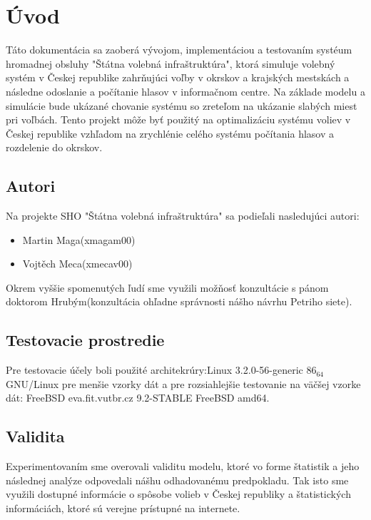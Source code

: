 \documentclass[12pt,a4paper,titlepage,final]{article}
\begin{document}


\tableofcontents
\newpage

\section{Úvod}
Táto dokumentácia sa zaoberá vývojom, implementáciou a testovaním systéum hromadnej obsluhy "Štátna volebná infraštruktúra", ktorá simuluje volebný systém v Českej republike zahrňujúci voľby v okrskov a krajských mestskách a následne odoslanie a počítanie hlasov v informačnom centre.
\indent
Na základe modelu a simulácie bude ukázané chovanie systému so zreteľom na ukázanie slabých miest pri voľbách. Tento projekt môže byť použitý na optimalizáciu systému voliev v Českej republike vzhľadom na zrychlénie celého systému počítania hlasov a rozdelenie do okrskov.

\subsection{Autori}
Na projekte SHO "Štátna volebná infraštruktúra" sa podieľali nasledujúci autori:
\begin{itemize}
\item Martin Maga(xmagam00)
\item Vojtěch Meca(xmecav00)
\end{itemize}

Okrem vyššie spomenutých ľudí sme využili možňosť konzultácie s pánom doktorom Hrubým(konzultácia ohľadne správnosti nášho návrhu Petriho siete).

\subsection{Testovacie prostredie}
Pre testovacie účely boli použité architekrúry:Linux 3.2.0-56-generic $86_64$ GNU/Linux pre menšie vzorky dát a pre rozsiahlejšie testovanie na väčšej vzorke dát: FreeBSD eva.fit.vutbr.cz 9.2-STABLE FreeBSD amd64.

\subsection{Validita}
Experimentovaním sme overovali validitu modelu, ktoré vo forme štatistik a jeho následnej analýze odpovedali nášhu odhadovanému predpokladu. Tak isto sme využili dostupné informácie o spôsobe volieb v Českej republiky a štatistických informáciách, ktoré sú verejne prístupné na internete.
\end{document}

